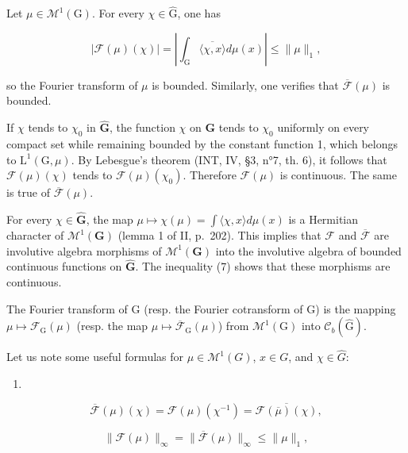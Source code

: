 Let \(\mu \in \mathcal{M}^1 (\mathrm{G})\). For every \(\chi \in \widehat{\mathrm{G}}\), one has

\[
| \mathcal {F} (\mu) (\chi) | = \left| \int_ {\mathrm{G}} \overline {{\langle \chi , x \rangle}} d \mu (x) \right| \leqslant \| \mu \| _ {1},\tag{7}
\]

so the Fourier transform of \(\mu\) is bounded. Similarly, one verifies that \(\overline{\mathcal{F}}(\mu)\) is bounded.

If \(\chi\) tends to \(\chi_0\) in \(\widehat{\mathbf{G}}\), the function \(\chi\) on \(\mathbf{G}\) tends to \(\chi_0\) uniformly on every compact set while remaining bounded by the constant function 1, which belongs to \(\mathrm{L}^1 (\mathrm{G},\mu)\). By Lebesgue's theorem (INT, IV, §3, n°7, th. 6), it follows that \(\mathcal{F}(\mu)(\chi)\) tends to \(\mathcal{F}(\mu)(\chi_0)\). Therefore \(\mathcal{F}(\mu)\) is continuous. The same is true of \(\overline{\mathcal{F}} (\mu)\).

For every \(\chi \in \widehat{\mathbf{G}}\), the map \(\mu \mapsto \chi(\mu) = \int \langle \chi, x \rangle d\mu(x)\) is a Hermitian character of \(\mathcal{M}^1(\mathbf{G})\) (lemma 1 of II, p.~202). This implies that \(\mathcal{F}\) and \(\overline{\mathcal{F}}\) are involutive algebra morphisms of \(\mathcal{M}^1(\mathbf{G})\) into the involutive algebra of bounded continuous functions on \(\widehat{\mathbf{G}}\). The inequality (7) shows that these morphisms are continuous.

The Fourier transform of G (resp. the Fourier cotransform of G) is the mapping \(\mu \mapsto \mathcal{F}_{\mathrm{G}}(\mu)\) (resp. the map \(\mu \mapsto \overline{\mathcal{F}}_{\mathrm{G}}(\mu)\)) from \(\mathcal{M}^1 (\mathrm{G})\) into \(\mathcal{C}_b(\widehat{\mathrm{G}})\).

Let us note some useful formulas for \(\mu\in\mathcal{M}^{1}(G)\), \(x\in G\), and \(\chi\in\widehat{G}\):

\begin{enumerate}
\def\labelenumi{(\arabic{enumi})}
\setcounter{enumi}{7}
\tightlist
\item
\end{enumerate}

\[
\overline {{\mathcal {F}}} (\mu) (\chi) = \mathcal {F} (\mu) (\chi^ {- 1}) = \overline {{\mathcal {F} (\overline {{\mu}}) (\chi)}},\tag{9}
\]

\[
\| \mathcal {F} (\mu) \| _ {\infty} = \| \overline {{\mathcal {F}}} (\mu) \| _ {\infty} \leqslant \| \mu \| _ {1},\tag{10}
\]

